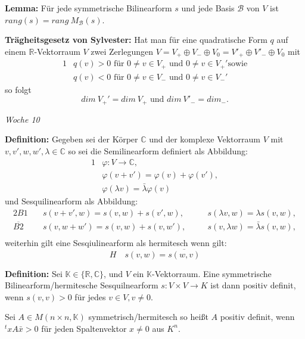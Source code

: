 \documentclass{article}
\begin{document}
\textbf{Lemma:} Für jede symmetrische Bilinearform $s$ und jede Basis
$\mathcal{B}$ von $V$ ist $rang(s)=rang\ M_\mathcal{B}(s)$.

\textbf{Trägheitsgesetz von Sylvester:} Hat man für eine quadratische Form $q$
auf einem $\mathbb{R}$-Vektorraum $V$ zwei Zerlegungen $V=V_+\oplus V_-\oplus
V_0 = V'_+\oplus V'_-\oplus V_0$ mit 
\begin{alignat*}{1}
	& q(v)>0\text{ für } 0\neq v\in V_+\text{ und } 0\neq v\in V_+'\text{
	sowie}\\
	& q(v)<0\text{ für } 0\neq v\in V_-\text{ und } 0\neq v\in V_-'
\end{alignat*}
so folgt
\begin{equation*}
	dim\ V_+'=dim\ V_+\text{  und  }dim\ V'_-=dim_-.
\end{equation*}

\textit{\small \hspace{-1.5cm}Woche 10}

\textbf{Definition:} Gegeben sei der Körper $\mathbb{C}$ und der komplexe
Vektorraum $V$ mit $v,v',w,w',\lambda\in\mathbb{C}$ so sei die Semilinearform
definiert als Abbildung:
\begin{alignat*}{1}
	&\varphi:V\to\mathbb{C},\\
	&\varphi(v+v')=\varphi(v)+\varphi(v'),\\
	&\varphi(\lambda v)=\bar\lambda\varphi(v)
\end{alignat*}
und Sesquilinearform als Abbildung:
\begin{alignat*}{2}
	B1\quad&s(v+v',w)=s(v,w)+s(v',w),&&\quad s(\lambda v,w)=\lambda
	s(v,w),\\
	\overline{B2}\quad&s(v,w+w')=s(v,w)+s(v,w'),&&\quad s(v,\lambda
	w)=\bar\lambda s(v,w),\\
\end{alignat*}
weiterhin gilt eine Sesqiulinearform als hermitesch wenn gilt:
\begin{equation*}
	H\quad s(v,w)=\overline{s(w,v)}
\end{equation*}

\textbf{Definition:} Sei $\mathbb{K}\in\{\mathbb{R,C}\}$, und $V$ ein
$\mathbb{K}$-Vektorraum. Eine symmetrische Bilinearform/hermitesche
Sesquilnearform $s:V\times V\to K$ ist dann positiv definit, wenn $s(v,v)>0$
für jedes $v\in V,v\neq 0$. 

Sei $A\in M(n\times n,\mathbb{K})$ symmetrisch/hermitesch so heißt $A$ positiv
definit, wenn ${^tx}A\bar x>0$ für jeden Spaltenvektor $x\neq0$ aus $K^n$.
\end{document}
